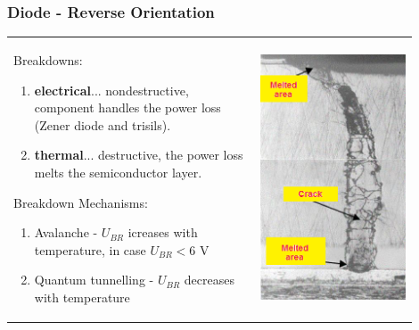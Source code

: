 \documentclass{beamer}
\begin{document}
	\begin{frame}
    \frametitle{Diode - Reverse Orientation}
		\begin{center}
			\begin{tabular}{m{0.55\linewidth} m{0.35\linewidth}}
			\small
			Breakdowns:
			
			\begin{enumerate}
				\item \textbf{electrical}... nondestructive, component handles the power loss (Zener diode and trisils).
				\item \textbf{thermal}... destructive, the power loss melts the semiconductor layer.
			\end{enumerate}
			Breakdown Mechanisms:
			
			\begin{enumerate}
				\item Avalanche - $U_{BR}$ icreases with temperature, in case $U_{BR} < 6$ V
				\item Quantum tunnelling - $U_{BR}$ decreases with temperature
			\end{enumerate}
			& \includegraphics[scale=0.40]{obr05_tepPruraz.png} 
			\end{tabular}
		\end{center}
	\end{frame}
\end{document}
